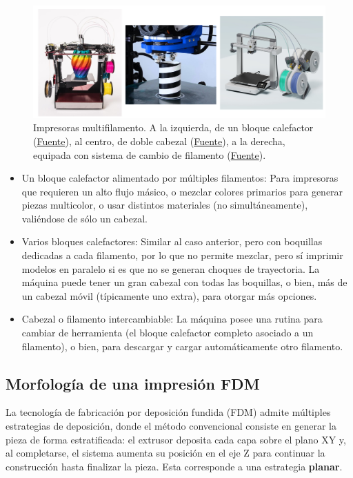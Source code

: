 \begin{figure}[h!]
	\centering
	\includegraphics[width=1.0\linewidth]{imgs/printers.png}
	\caption{Impresoras multifilamento. A la izquierda, de un bloque calefactor (\href{https://3dprint.com/144414/rova4d-full-color-blender-printer/}{Fuente}), al centro, de doble cabezal  (\href{https://printingatoms.com/3d-printers/best-dual-extruder-3d-printer/}{Fuente}), a la derecha, equipada con sistema de cambio de filamento  (\href{https://bambulab.com/es/a1}{Fuente}).}
	\label{printersfig}
\end{figure} 

\begin{itemize}
	\item Un bloque calefactor alimentado por múltiples filamentos: Para impresoras que requieren un alto flujo másico, o mezclar colores primarios para generar piezas multicolor, o usar distintos materiales (no simultáneamente), valiéndose de sólo un cabezal.
	\item Varios bloques calefactores: Similar al caso anterior, pero con boquillas dedicadas a cada filamento, por lo que no permite mezclar, pero sí imprimir modelos en paralelo si es que no se generan choques de trayectoria. La máquina puede tener un gran cabezal con todas las boquillas, o bien, más de un cabezal móvil (típicamente uno extra), para otorgar más opciones.
	\item Cabezal o filamento intercambiable: La máquina posee una rutina para cambiar de herramienta (el bloque calefactor completo asociado a un filamento), o bien, para descargar y cargar automáticamente otro filamento. 
\end{itemize}

\subsection{Morfología de una impresión FDM}

La tecnología de fabricación por deposición fundida (FDM) admite múltiples estrategias de deposición, donde el método convencional consiste en generar la pieza de forma estratificada: el extrusor deposita cada capa sobre el plano XY y, al completarse, el sistema aumenta su posición en el eje Z para continuar la construcción hasta finalizar la pieza. Esta corresponde a una estrategia \textbf{planar}.

